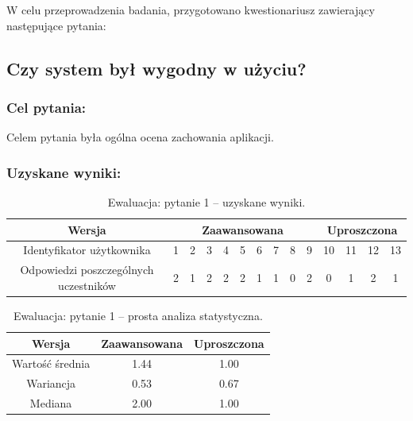 W celu przeprowadzenia badania, przygotowano kwestionariusz zawierający następujące pytania:

\subsection{Czy system był wygodny w użyciu?}

	\subsubsection{Cel pytania:}
	
	Celem pytania była ogólna ocena zachowania aplikacji.
	\clearpage
	
	\subsubsection{Uzyskane wyniki:}
	
	\begin{table}[!h]
		\caption{Ewaluacja: pytanie 1 -- uzyskane wyniki.}
		\centering
		\begin{tabular}{|c|c|c|c|c|c|c|c|c|c|c|c|c|c|}
			\hline
			Wersja &  \multicolumn{9}{c|}{Zaawansowana} & \multicolumn{4}{c|}{Uproszczona}\\ \hline
			Identyfikator użytkownika             & 1 & 2 & 3 & 4 & 5 & 6 & 7 & 8 & 9 
			                                      & 10 & 11 & 12 & 13 \\ \hline
			Odpowiedzi poszczególnych uczestników & 2 & 1 & 2 & 2 & 2 & 1 & 1 & 0 & 2 
			                                      & 0 & 1 & 2 & 1     \\ \hline
		\end{tabular}
	\end{table}

	\begin{table}[!h]
		\caption{Ewaluacja: pytanie 1 -- prosta analiza statystyczna.}
		\centering
		\begin{tabular}{|c|c|c|}
			\hline
			Wersja          & Zaawansowana & Uproszczona \\ \hline
			Wartość średnia & 1.44         & 1.00        \\ \hline
			Wariancja       & 0.53         & 0.67        \\ \hline
			Mediana         & 2.00         & 1.00        \\ \hline
		\end{tabular}
	\end{table}


